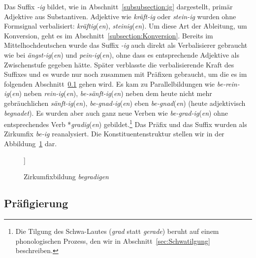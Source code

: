 Das Suffix \textit{-ig} bildet, wie in Abschnitt~\ref{subsubsection:ig} dargestellt, primär Adjektive aus Substantiven. Adjektive wie \textit{kräft-ig} oder \textit{stein-ig} wurden ohne Formsignal verbalisiert: \textit{kräftig}(\textit{en}), \textit{steinig}(\textit{en}). Um diese Art der Ableitung, um Konversion, geht es im Abschnitt~\ref{subsection:Konversion}. Bereits im Mittelhochdeutschen wurde das Suffix \textit{-ig} auch direkt als Verbalisierer gebraucht wie bei \textit{ängst-ig}(\textit{en}) und \textit{pein-ig}(\textit{en}), ohne dass es entsprechende Adjektive als Zwischenstufe gegeben hätte. Später verblasste die verbalisierende Kraft des Suffixes und es wurde nur noch zusammen mit Präfixen gebraucht, um die es im folgenden Abschnitt~\ref{subsection:Präfigierung} gehen wird. Es kam zu Parallelbildungen wie \textit{be-rein-ig}(\textit{en}) neben \textit{rein-ig}(\textit{en}), \textit{be-sänft-ig}(\textit{en}) neben dem heute nicht mehr gebräuchlichen \textit{sänft-ig}(\textit{en}), \textit{be-gnad-ig}(\textit{en}) eben \textit{be-gnad}(\textit{en}) (heute adjektivisch \textit{begnadet}). Es wurden aber auch ganz neue Verben wie \textit{be-grad-ig}(\textit{en}) ohne entsprechendes Verb *\textit{gradig}(\textit{en}) gebildet.\footnote{Die Tilgung des Schwa-Lautes (\textit{grad} statt \textit{gerade}) beruht auf einem phonologischen Prozess, den wir in Abschnitt~\ref{sec:Schwatilgung} beschreiben.} Das Präfix und das Suffix wurden als Zirkumfix \textit{be-ig} reanalysiert. Die Konstituentenstruktur stellen wir in der Abbildung~\ref{Abb:begradigen} dar.

\begin{figure}
	\centering
\begin{forest}
	[Stammform \\ Verb \\ \textit{begradig-} [Zirkumfix \\bildet Verb \\ \textit{be-}] [Derivationsstammform \\ Adjektiv \\ \textit{grad}] [Zirkumfix \\ bildet Verb \\ \textit{-ig}] ]
\end{forest}
\caption{Zirkumfixbildung \textit{begradigen}}\label{Abb:begradigen}
\end{figure}
 
         
\subsection{Präfigierung}\label{subsection:Präfigierung}

